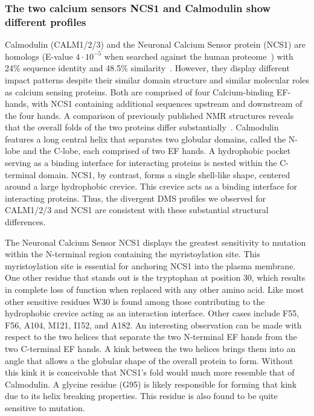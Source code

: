 \subsubsection{The two calcium sensors NCS1 and Calmodulin show different profiles}

Calmodulin (CALM1/2/3) and the Neuronal Calcium Sensor protein (NCS1) are homologs (E-value $4 \cdot 10^{-5}$ when searched against the human proteome~\cite{altschul_basic_1990,the_uniprot_consortium_uniprot:_2015}) with 24\% sequence identity and 48.5\% similarity~\cite{rice_emboss:_2000}. However, they display different impact patterns despite their similar domain structure and similar molecular roles as calcium sensing proteins. Both are comprised of four Calcium-binding EF-hands, with NCS1 containing additional sequences upstream and downstream of the four hands. A comparison of previously published NMR structures reveals that the overall folds of the two proteins differ substantially~\cite{sarhan_crystallographic_2012,heidarsson_c-terminal_2012}. Calmodulin features a long central helix that separates two globular domains, called the N-lobe and the C-lobe, each comprised of two EF hands. A hydrophobic pocket serving as a binding interface for interacting proteins is nested within the C-terminal domain. NCS1, by contrast, forms a single shell-like shape, centered around a large hydrophobic crevice. This crevice acts as a binding interface for interacting proteins. Thus, the divergent DMS profiles we observed for CALM1/2/3 and NCS1 are consistent with these substantial structural differences.

The Neuronal Calcium Sensor NCS1 displays the greatest sensitivity to mutation within the N-terminal region containing the myristoylation site.  This myristoylation site is essential for anchoring NCS1 into the plasma membrane. One other residue that stands out is the tryptophan at position 30, which results in complete loss of function when replaced with any other amino acid. Like most other sensitive residues W30 is found among those contributing to the hydrophobic crevice acting as an interaction interface. Other cases include F55, F56, A104, M121, I152, and A182. An interesting observation can be made with respect to the two helices that separate the two N-terminal EF hands from the two C-terminal EF hands. A kink between the two helices brings them into an angle that allows a the globular shape of the overall protein to form. Without this kink it is conceivable that NCS1's fold would much more resemble that of Calmodulin. A glycine residue (G95) is likely responsible for forming that kink due to its helix breaking properties. This residue is also found to be quite sensitive to mutation.

